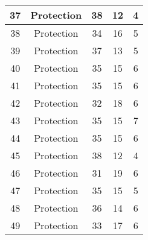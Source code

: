 \documentclass[results.tex]{subfiles}
\begin{document}
\begin{center}
\begin{tabular}{| c || c | c | c | c |}
            \hline
            37                      & Protection                   & 38                     & 12                      & 4                    \\
            \hline
            38                      & Protection                   & 34                     & 16                      & 5                    \\
            \hline
            39                      & Protection                   & 37                     & 13                      & 5                    \\
            \hline
            40                      & Protection                   & 35                     & 15                      & 6                    \\
            \hline
            41                      & Protection                   & 35                     & 15                      & 6                    \\
            \hline
            42                      & Protection                   & 32                     & 18                      & 6                    \\
            \hline
            43                      & Protection                   & 35                     & 15                      & 7                    \\
            \hline
            44                      & Protection                   & 35                     & 15                      & 6                    \\
            \hline
            45                      & Protection                   & 38                     & 12                      & 4                    \\
            \hline
            46                      & Protection                   & 31                     & 19                      & 6                    \\
            \hline
            47                      & Protection                   & 35                     & 15                      & 5                    \\
            \hline
            48                      & Protection                   & 36                     & 14                      & 6                    \\
            \hline
            49                      & Protection                   & 33                     & 17                      & 6                    \\
            \hline
        \end{tabular}
    \end{center}
\end{document}
